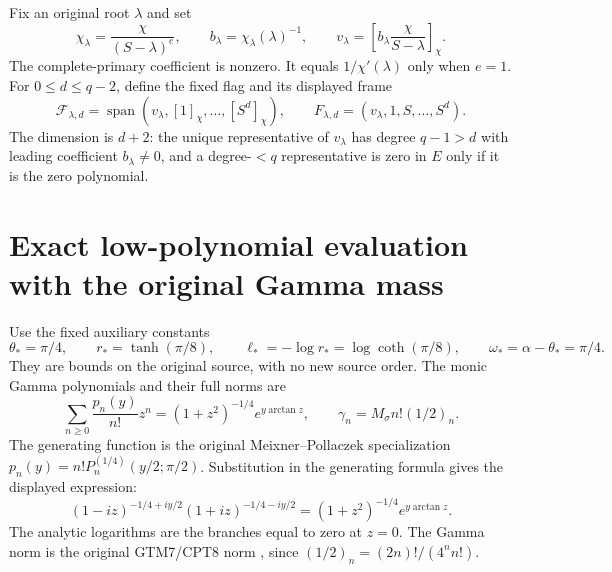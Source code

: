 \documentclass[11pt]{article}
\newcommand{\Fcal}{\mathscr F}
\begin{document}
Fix an original root \(\lambda\) and set
\begin{equation}\tag{GMF4}
 \chi_\lambda=\frac{\chi}{(S-\lambda)^e},\qquad
 b_\lambda=\chi_\lambda(\lambda)^{-1},\qquad
 v_\lambda=\left[b_\lambda\frac{\chi}{S-\lambda}\right]_\chi .
\end{equation}
The complete-primary coefficient is nonzero.
It equals \(1/\chi'(\lambda)\) only when \(e=1\).
For \(0\le d\le q-2\), define the fixed flag and its displayed frame
\begin{equation}\tag{GMF5}
 \Fcal_{\lambda,d}
 =\operatorname{span}(v_\lambda,[1]_\chi,\ldots,[S^d]_\chi),
 \qquad F_{\lambda,d}=(v_\lambda,1,S,\ldots,S^d).
\end{equation}
The dimension is \(d+2\): the unique representative of
\(v_\lambda\) has degree \(q-1>d\) with leading coefficient
\(b_\lambda\ne0\), and a degree-\(<q\) representative is zero
in \(E\) only if it is the zero polynomial.

\section{Exact low-polynomial evaluation with the original Gamma mass}

Use the fixed auxiliary constants
\begin{equation}\tag{GMF6}
 \theta_*=\pi/4,\qquad
 r_*=\tanh(\pi/8),\qquad
 \ell_*=-\log r_*=\log\coth(\pi/8),\qquad
 \omega_*=\alpha-\theta_*=\pi/4.
\end{equation}
They are bounds on the original source, with no new source order.
The monic Gamma polynomials and their full norms are
\[
 \sum_{n\ge0}\frac{p_n(y)}{n!}z^n
 =(1+z^2)^{-1/4}e^{y\arctan z},\qquad
 \gamma_n=M_\sigma n!(1/2)_n.
\]
The generating function is the original
Meixner--Pollaczek specialization
\(p_n(y)=n!P_n^{(1/4)}(y/2;\pi/2)\).
Substitution in the generating formula
\cite[(18.23.7)]{dlmfMPgen} gives the displayed expression:
\[
 (1-iz)^{-1/4+iy/2}(1+iz)^{-1/4-iy/2}
       =(1+z^2)^{-1/4}e^{y\arctan z}.
\]
The analytic logarithms are the branches equal to zero at \(z=0\).
The Gamma norm is the original GTM7/CPT8 norm
\cite{providers,cpt}, since
\((1/2)_n=(2n)!/(4^n n!)\).
\end{document}

